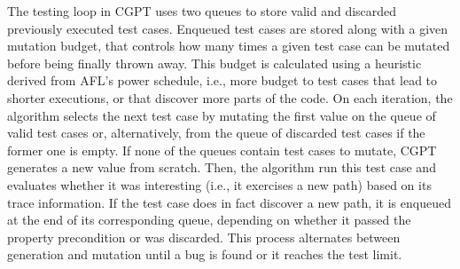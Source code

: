 \documentclass[sigconf, anonymous, review]{acmart}
\begin{document}

The testing loop in CGPT uses two queues to store valid and discarded previously
executed test cases.
%
Enqueued test cases are stored along with a given mutation budget, that controls
how many times a given test case can be mutated before being finally thrown
away.
%
This budget is calculated using a heuristic derived from AFL's power schedule,
i.e., more budget to test cases that lead to shorter executions, or that
discover more parts of the code.
%
On each iteration, the algorithm selects the next test case by mutating the
first value on the queue of valid test cases or, alternatively, from the queue
of discarded test cases if the former one is empty.
%
If none of the queues contain test cases to mutate, CGPT generates a new value
from scratch.
%
Then, the algorithm run this test case and evaluates whether it was interesting
(i.e., it exercises a new path) based on its trace information.
%
If the test case does in fact discover a new path, it is enqueued at the end of
its corresponding queue, depending on whether it passed the property
precondition or was discarded.
%
%
This process alternates between generation and mutation until a bug is found or
it reaches the test limit.






\end{document}
